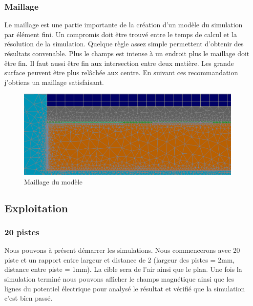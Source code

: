 \subsubsection{Maillage}
Le maillage est une partie importante de la création d'un modèle du simulation par élément fini. Un compromis doit être trouvé entre le temps de calcul et la résolution de la simulation. Quelque règle assez simple permettent d'obtenir des résultats convenable. Plus le champs est intense à un endroit plus le maillage doit être fin. Il faut aussi être fin aux intersection entre deux matière. Les grande surface peuvent être plus relâchée aux centre. En suivant ces recommandation j'obtiens un maillage satisfaisant.


\begin{figure}[!ht]
 \centering
 \includegraphics[width=14cm]{C20maillage.png}
 \caption{Maillage du modèle}
\end{figure}


\subsection{Exploitation}

\subsubsection{20 pistes}
Nous pouvons à présent démarrer les simulations. Nous commencerons avec 20 piste et un rapport entre largeur et distance de 2 (largeur des pistes = 2mm, distance entre piste = 1mm). La cible sera de l'air ainsi que le plan. Une fois la simulation terminé nous pouvons afficher le champs magnétique ainsi que les lignes du potentiel électrique pour analysé le résultat et vérifié que la simulation c'est bien passé.

